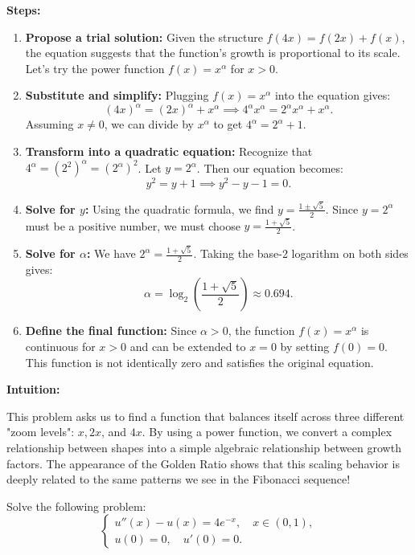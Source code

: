 \begin{solution}
\textbf{Steps:}
\begin{enumerate}
    \item \textbf{Propose a trial solution:} Given the structure $f(4x) = f(2x) + f(x)$, the equation suggests that the function's growth is proportional to its scale. Let's try the power function $f(x) = x^\alpha$ for $x > 0$.
    \item \textbf{Substitute and simplify:} Plugging $f(x) = x^\alpha$ into the equation gives:
        \[ (4x)^\alpha = (2x)^\alpha + x^\alpha \implies 4^\alpha x^\alpha = 2^\alpha x^\alpha + x^\alpha. \]
        Assuming $x \neq 0$, we can divide by $x^\alpha$ to get $4^\alpha = 2^\alpha + 1$.
    \item \textbf{Transform into a quadratic equation:} Recognize that $4^\alpha = (2^2)^\alpha = (2^\alpha)^2$. Let $y = 2^\alpha$. Then our equation becomes:
        \[ y^2 = y + 1 \implies y^2 - y - 1 = 0. \]
    \item \textbf{Solve for $y$:} Using the quadratic formula, we find $y = \frac{1 \pm \sqrt{5}}{2}$. Since $y = 2^\alpha$ must be a positive number, we must choose $y = \frac{1+\sqrt{5}}{2}$.
    \item \textbf{Solve for $\alpha$:} We have $2^\alpha = \frac{1+\sqrt{5}}{2}$. Taking the base-2 logarithm on both sides gives:
        \[ \alpha = \log_2 \left( \frac{1+\sqrt{5}}{2} \right) \approx 0.694. \]
    \item \textbf{Define the final function:} Since $\alpha > 0$, the function $f(x) = x^\alpha$ is continuous for $x > 0$ and can be extended to $x = 0$ by setting $f(0) = 0$. This function is not identically zero and satisfies the original equation.
\end{enumerate}


\textbf{Intuition:}

This problem asks us to find a function that balances itself across three different "zoom levels": $x, 2x$, and $4x$. By using a power function, we convert a complex relationship between shapes into a simple algebraic relationship between growth factors. The appearance of the Golden Ratio shows that this scaling behavior is deeply related to the same patterns we see in the Fibonacci sequence!
\end{solution}

\begin{exercise}
\label{analysis:2011:2}
Solve the following problem:
\[
\begin{cases}
u''(x) - u(x) = 4 e^{-x}, \quad x \in (0, 1), \\
u(0) = 0, \quad u'(0) = 0.
\end{cases}
\]
\end{exercise}

